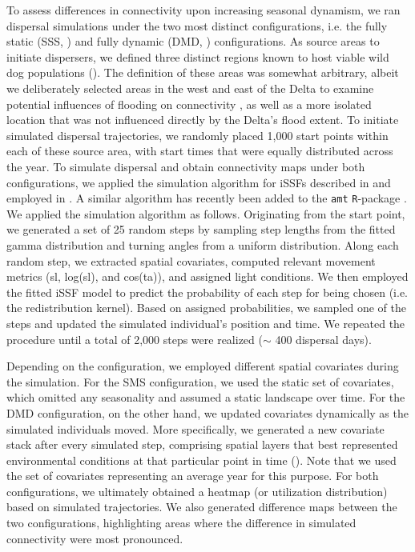 \documentclass[abstract=on,10pt,a4paper,bibliography=totocnumbered]{article}
\begin{document}
To assess differences in connectivity upon increasing seasonal dynamism, we ran
dispersal simulations under the two most distinct configurations, i.e. the fully
static (SSS, ) and fully dynamic (DMD,
) configurations. As source areas to initiate
dispersers, we defined three distinct regions known to host viable wild dog
populations (). The definition of these areas was somewhat
arbitrary, albeit we deliberately selected areas in the west and east of the
Delta to examine potential influences of flooding on connectivity
\citep{Hofmann.2024}, as well as a more isolated location that was not
influenced directly by the Delta's flood extent. To initiate simulated dispersal
trajectories, we randomly placed 1,000 start points within each of these source
area, with start times that were equally distributed across the year. To
simulate dispersal and obtain connectivity maps under both configurations, we
applied the simulation algorithm for iSSFs described in \citet{Signer.2017} and
employed in \citet{Hofmann.2023}. A similar algorithm has recently been added to
the \texttt{amt} \texttt{R}-package \citep{Signer.2024}. We applied the
simulation algorithm as follows. Originating from the start point, we generated
a set of 25 random steps by sampling step lengths from the fitted gamma
distribution and turning angles from a uniform distribution. Along each random
step, we extracted spatial covariates, computed relevant movement metrics (sl,
log(sl), and cos(ta)), and assigned light conditions. We then employed the
fitted iSSF model to predict the probability of each step for being chosen (i.e.
the redistribution kernel). Based on assigned probabilities, we sampled one of
the steps and updated the simulated individual's position and time. We repeated
the procedure until a total of 2,000 steps were realized ($\sim$ 400 dispersal
days).

Depending on the configuration, we employed different spatial covariates during
the simulation. For the SMS configuration, we used the static set of covariates,
which omitted any seasonality and assumed a static landscape over time. For the
DMD configuration, on the other hand, we updated covariates dynamically as the
simulated individuals moved. More specifically, we generated a new covariate
stack after every simulated step, comprising spatial layers that best
represented environmental conditions at that particular point in time
(). Note that we used the set of covariates representing an
average year for this purpose. For both configurations, we ultimately obtained a
heatmap (or utilization distribution) based on simulated trajectories. We also
generated difference maps between the two configurations, highlighting areas
where the difference in simulated connectivity were most pronounced.
\end{document}
